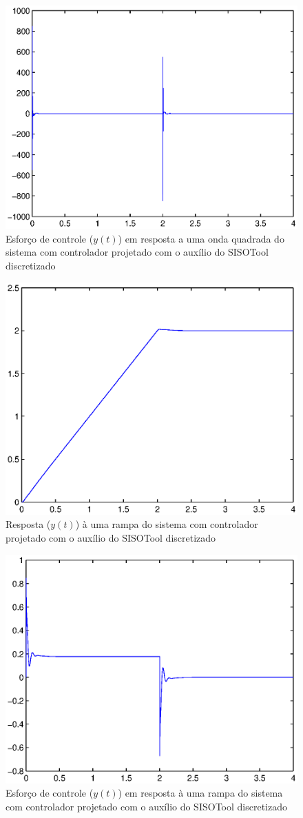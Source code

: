 \documentclass{article}
\begin{document}
\begin{figure}[H]
	\centering
	\includegraphics[width=0.8\linewidth]{stepuSISO}
	\caption{Esforço de controle ($y(t)$) em resposta a uma onda quadrada do sistema com controlador projetado com o auxílio do SISOTool discretizado}
	\label{fig:stepuSISO}
\end{figure}
\begin{figure}[H]
	\centering
	\includegraphics[width=0.8\linewidth]{rampSISO}
	\caption{Resposta ($y(t)$) à uma rampa do sistema com controlador projetado com o auxílio do SISOTool discretizado}
	\label{fig:rampSISO}
\end{figure}
\begin{figure}[H]
	\centering
	\includegraphics[width=0.8\linewidth]{rampuSISO}
	\caption{Esforço de controle ($y(t)$) em resposta à uma rampa do sistema com controlador projetado com o auxílio do SISOTool discretizado}
	\label{fig:rampuSISO}
\end{figure}
\end{document}
